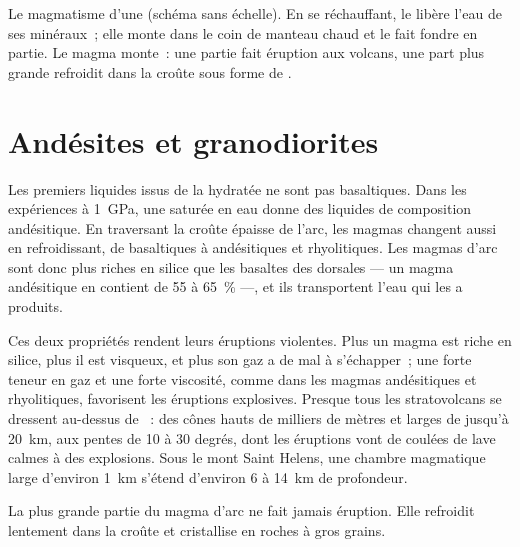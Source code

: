 \begin{omfigure}
{\small Le magmatisme d'une  (schéma sans échelle). En se
réchauffant, le  libère l'eau de ses minéraux~; elle monte
dans le coin de manteau chaud et le fait fondre en partie. Le magma
monte~: une partie fait éruption aux volcans, une part plus grande refroidit
dans la croûte sous forme de .}
\end{omfigure}

\section{Andésites et granodiorites}

Les premiers liquides issus de la  hydratée ne sont pas
basaltiques. Dans les expériences à \qty{1}{GPa}, une  saturée en
eau donne des liquides de composition andésitique. En traversant la croûte
épaisse de l'arc, les magmas changent aussi en refroidissant, de
basaltiques à andésitiques et rhyolitiques. Les magmas d'arc sont donc plus
riches en silice que les basaltes des dorsales --- un magma andésitique en
contient de 55 à \qty{65}{\percent} ---, et ils transportent l'eau qui les
a produits.

Ces deux propriétés rendent leurs éruptions violentes. Plus un magma est
riche en silice, plus il est visqueux, et plus son gaz a de mal à
s'échapper~; une forte teneur en gaz et une forte viscosité, comme dans les
magmas andésitiques et rhyolitiques, favorisent les éruptions explosives.
Presque tous les stratovolcans se dressent au-dessus de ~: des cônes hauts de milliers de mètres et larges de jusqu'à
\qty{20}{km}, aux pentes de 10 à 30 degrés, dont les éruptions vont de
coulées de lave calmes à des explosions. Sous le mont Saint Helens, une
chambre magmatique large d'environ \qty{1}{km} s'étend d'environ 6 à
\qty{14}{km} de profondeur.

La plus grande partie du magma d'arc ne fait jamais éruption. Elle refroidit
lentement dans la croûte et cristallise en roches à gros grains.

